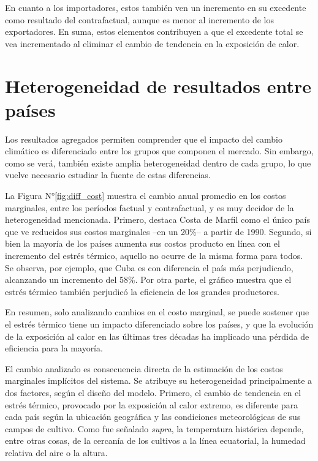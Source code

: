 En cuanto a los importadores, estos también ven un incremento en su excedente como resultado del contrafactual, aunque es menor al incremento de los exportadores. En suma, estos elementos contribuyen a que el excedente total se vea incrementado al eliminar el cambio de tendencia en la exposición de calor.


\section{Heterogeneidad de resultados entre países}

Los resultados agregados permiten comprender que el impacto del cambio climático es diferenciado entre los grupos que componen el mercado. Sin embargo, como se verá, también existe amplia heterogeneidad dentro de cada grupo, lo que vuelve necesario estudiar la fuente de estas diferencias.

La Figura N°\ref{fig:diff_cost} muestra el cambio anual promedio en los costos marginales, entre los períodos factual y contrafactual, y es muy decidor de la heterogeneidad mencionada. Primero, destaca Costa de Marfil como el único país que ve reducidos sus costos marginales --en un 20\%-- a partir de 1990. Segundo, si bien la mayoría de los países aumenta sus costos producto en línea con el incremento del estrés térmico, aquello no ocurre de la misma forma para todos. Se observa, por ejemplo, que Cuba es con diferencia el país más perjudicado, alcanzando un incremento del 58\%. Por otra parte, el gráfico muestra que el estrés térmico también perjudicó la eficiencia de los grandes productores.

En resumen, solo analizando cambios en el costo marginal, se puede sostener que el estrés térmico tiene un impacto diferenciado sobre los países, y que la evolución de la exposición al calor en las últimas tres décadas ha implicado una pérdida de eficiencia para la mayoría.

El cambio analizado es consecuencia directa de la estimación de los costos marginales implícitos del sistema. Se atribuye su heterogeneidad principalmente a dos factores, según el diseño del modelo. Primero, el cambio de tendencia en el estrés térmico, provocado por la exposición al calor extremo, es diferente para cada país según la ubicación geográfica y las condiciones meteorológicas de sus campos de cultivo. Como fue señalado \textit{supra}, la temperatura histórica depende, entre otras cosas, de la cercanía de los cultivos a la línea ecuatorial, la humedad relativa del aire o la altura. 

